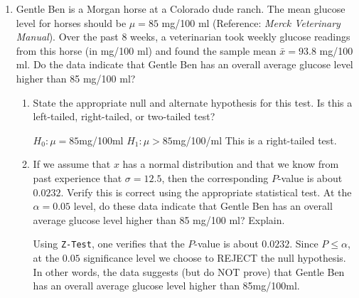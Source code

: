\documentclass{article}
\newcommand{\answer}[1]{\color{white}#1}
\begin{document}
\begin{enumerate}
\begin{enumerate}
	{\answer $H_1: \mu < 16.4$ feet.} 
	 
	
	\item Suppose you do not know whether the storm is getting worse or dying out. You just want to test the hypothesis that the average wave height is {\it different} (either higher or lower) from the severe storm class rating. What would you use for the alternate hypothesis? 
	
	{\answer $H_1: \mu \neq 16.4$ feet.} 
	 
	
	\item For each of the tests in parts (b), (c), and (d), would the area corresponding to the $P$-value be on the left, on the right, or on both sides of the mean? Explain your answer in each case. 
	
	{\answer (b) Right; (c) Left; (d) Both Sides.  
	That is, for (b), we use a right-tailed test; for (c), we use a left-tailed test; and for (d), we use a two-tailed test.} 
	 

	\end{enumerate}

\vfill

\newpage
\item Gentle Ben is a Morgan horse at a Colorado dude ranch. The mean glucose level for horses should be $\mu = 85$ mg/100 ml (Reference: {\em Merck Veterinary Manual}). Over the past 8 weeks, a veterinarian took weekly glucose readings from this horse (in mg/100 ml) and found the sample mean $\bar{x} = 93.8$ mg/100 ml. Do the data indicate that Gentle Ben has an overall average glucose level higher than 85 mg/100 ml?
	\begin{enumerate}
	\item State the appropriate null and alternate hypothesis for this test. Is this a left-tailed, right-tailed, or two-tailed test? 
	
	{\answer $H_0: \mu = 85$mg/100ml 
	$H_1: \mu > 85$mg/100/ml 
	This is a right-tailed test. } 
	
	\item If we assume that $x$ has a normal distribution and that we know from past experience that $\sigma = 12.5$, then the corresponding $P$-value is about $0.0232$. Verify this is correct using the appropriate statistical test. At the $\alpha = 0.05$ level, do these data indicate that Gentle Ben has an overall average glucose level higher than 85 mg/100 ml? Explain. 
	
	{\answer Using \texttt{Z-Test}, one verifies that the $P$-value is about $0.0232$. Since $P\leq \alpha$, at the $0.05$ significance level we choose to REJECT the null hypothesis. In other words, the data suggests (but do NOT prove) that Gentle Ben has an overall average glucose level higher than 85mg/100ml.} 
	

\end{enumerate}
\end{enumerate}
\end{document}
